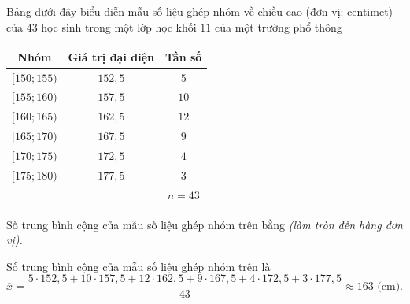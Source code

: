 \begin{bt}%
	Bảng dưới đây biểu diễn mẫu số liệu ghép nhóm về chiều cao (đơn vị: centimet) của $43$ học sinh trong một lớp học khối $11$ của một trường phổ thông
	\begin{center}
		\begin{tabular}{|c|c|c|}
			\hline
			Nhóm & Giá trị đại diện & Tần số \\
			\hline
			$[150;155)$ & $152{,}5$ & $5$ \\
			\hline
			$[155;160)$ & $157{,}5$ & $10$ \\
			\hline
			$[160;165)$ & $162{,}5$ & $12$ \\
			\hline
			$[165;170)$ & $167{,}5$ & $9$ \\
			\hline
			$[170;175)$ & $172{,}5$ & $4$ \\
			\hline
			$[175;180)$ & $177{,}5$ & $3$ \\
			\hline
			& & $n=43$ \\
			\hline
		\end{tabular}
	\end{center}
	Số trung bình cộng của mẫu số liệu ghép nhóm trên bằng \textit{(làm tròn đến hàng đơn vị).}
	
	\loigiai
	{
		Số trung bình cộng của mẫu số liệu ghép nhóm trên là
		$$\overline{x}=\dfrac{5\cdot 152{,}5+10\cdot 157{,}5+12\cdot 162{,}5+9\cdot 167{,}5+4\cdot 172{,}5+3\cdot 177{,}5}{43} \approx 163 \text{ (cm).}$$
	}
\end{bt}

